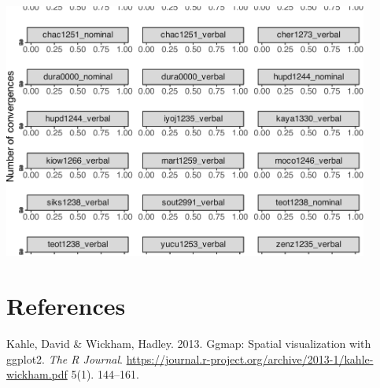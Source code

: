 \documentclass[
]{article}
\newlength{\cslhangindent}
\newenvironment{CSLReferences}[2] %
 {\begin{list}{}{%
  \setlength{\itemindent}{0pt}
  \setlength{\leftmargin}{0pt}
  \setlength{\parsep}{0pt}
  \ifodd #1
   \setlength{\leftmargin}{\cslhangindent}
   \setlength{\itemindent}{-1\cslhangindent}
  \fi
  \setlength{\itemsep}{#2\baselineskip}}}
 {\end{list}}
\begin{document}
\begin{center}\includegraphics[width=0.9\textwidth,height=\textheight]{02_analyses_chapter17_files/figure-latex/conv morph-1} \end{center}

\section*{References}\label{references}

\label{refs}
\begin{CSLReferences}{1}{0}
Kahle, David \& Wickham, Hadley. 2013. Ggmap: Spatial visualization with
ggplot2. \emph{The R Journal}.
\url{https://journal.r-project.org/archive/2013-1/kahle-wickham.pdf}
5(1). 144--161.

\end{CSLReferences}
\end{document}

